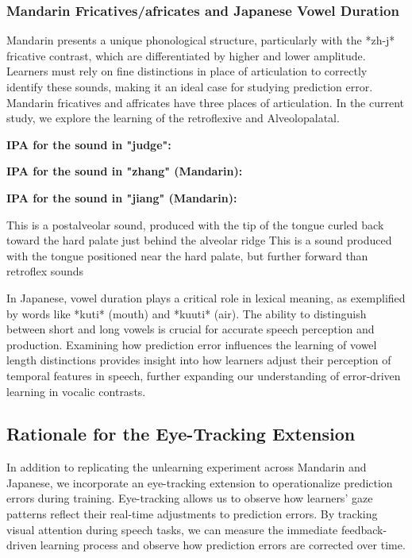 \subsubsection{Mandarin Fricatives/africates and Japanese Vowel Duration}

Mandarin presents a unique phonological structure, particularly with the *zh-j* fricative contrast, which are differentiated by higher and lower amplitude. Learners must rely on fine distinctions in place of articulation to correctly identify these sounds, making it an ideal case for studying prediction error. Mandarin fricatives and affricates have three places of articulation. In the current study, we explore the learning of the retroflexive and Alveolopalatal. 

\textbf{IPA for the sound in "judge":} \textipa{[dZ]}

\textbf{IPA for the sound in "zhang" (Mandarin):} \textipa{[tS\super{r}]}

\textbf{IPA for the sound in "jiang" (Mandarin):} \textipa{[tC]}


This is a postalveolar sound, produced with the tip of the tongue curled back toward the hard palate just behind the alveolar ridge
This is a sound produced with the tongue positioned near the hard palate, but further forward than retroflex sounds

In Japanese, vowel duration plays a critical role in lexical meaning, as exemplified by words like *kuti* (mouth) and *kuuti* (air). The ability to distinguish between short and long vowels is crucial for accurate speech perception and production. Examining how prediction error influences the learning of vowel length distinctions provides insight into how learners adjust their perception of temporal features in speech, further expanding our understanding of error-driven learning in vocalic contrasts.

\subsection{Rationale for the Eye-Tracking Extension}

In addition to replicating the unlearning experiment across Mandarin and Japanese, we incorporate an eye-tracking extension to operationalize prediction errors during training. Eye-tracking allows us to observe how learners' gaze patterns reflect their real-time adjustments to prediction errors. By tracking visual attention during speech tasks, we can measure the immediate feedback-driven learning process and observe how prediction errors are corrected over time.

